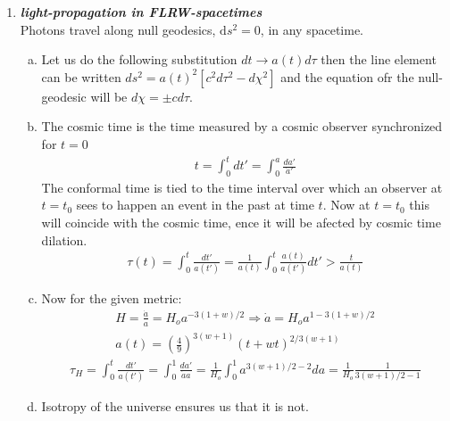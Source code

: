 \documentclass[a4paper,12pt]{article}
\newcommand{\question}[1]{\textbf{\textit{#1}}}
\newcommand{\dd}{\mathrm{d}}
\begin{document}
\begin{enumerate}
		\item \question{light-propagation in FLRW-spacetimes}\\
		Photons travel along null geodesics, $\dd s^2=0$, in any spacetime. 
		\begin{enumerate}[(a)]
			\item Let us do the following substitution $dt
                          \rightarrow a(t)d\tau$ then the line element
                          can be written
                          $ds^2=a(t)^2[c^2d\tau^2-d\chi^2]$ and the
                          equation ofr the null-geodesic will be
                          $d\chi=\pm cd\tau$.
			\item The cosmic time is the time measured by
                          a cosmic observer synchronized for $t=0$ 
 \begin{align}
   t=\int_0^t dt' = \int_0^a\frac{da'}{\dot{a}'}
   \end{align}
The conformal time is tied to the time interval over which an observer
at $t=t_0$ sees to happen an event in the past at time $t$. Now at
$t=t_0$ this will coincide with the cosmic time, ence it will be
afected by cosmic time dilation.
                          \begin{align}
                            \tau(t)=\int_0^t \frac{dt'}{a(t')} = \frac{1}{a(t)}
                              \int_0^t \frac{a(t)}{a(t')} dt' > \frac{t}{a(t)}
                          \end{align}
			\item Now for the given metric:
                          \begin{align}
                            H=\frac{\dot{a}}{a}= H_o a^{-3(1+w)/2}
                            \Rightarrow \dot{a} = H_o
                            a^{1-3(1+w)/2}\\
                            a(t)=\left(\frac{4}{9}\right)^{3(w+1)}(t+wt)^{2/3(w+1)}
                            \end{align}
                          \begin{align}
                            \tau_H=\int_0^t \frac{dt'}{a(t')} =
                            \int_0^1 \frac{da'}{\dot{a}a} =
                            \frac{1}{H_o}\int_0^1 a^{3(w+1)/2 -2}da =  \frac{1}{H_o}\frac{1}{3(w+1)/2 -1}
                            \end{align}
			\item Isotropy of the universe ensures us that
                          it is not.
		\end{enumerate}
		

\end{enumerate}
\end{document}
